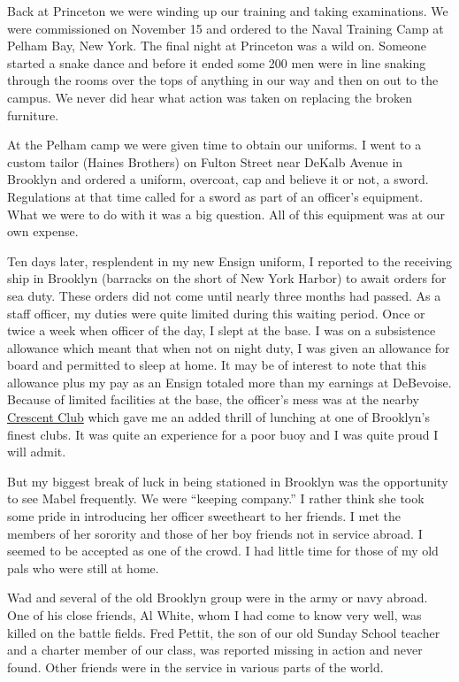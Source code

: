 \documentclass[12pt]{book}              %
\begin{document}
Back at Princeton we were winding up our training and taking examinations. We were commissioned on November 15 and ordered to the Naval Training Camp at Pelham Bay, New York. The final night at Princeton was a wild on. Someone started a snake dance and before it ended some 200 men were in line snaking through the rooms over the tops of anything in our way and then on out to the campus. We never did hear what action was taken on replacing the broken furniture. 

At the Pelham camp we were given time to obtain our uniforms. I went to a custom tailor (Haines Brothers) on Fulton Street near DeKalb Avenue in Brooklyn and ordered a uniform, overcoat, cap and believe it or not, a sword. Regulations at that time called for a sword as part of an officer's equipment. What we were to do with it was a big question. All of this equipment was at our own expense. 

Ten days later, resplendent in my new Ensign uniform, I reported to the receiving ship in Brooklyn (barracks on the short of New York Harbor) to await orders for sea duty. These orders did not come until nearly three months had passed. As a staff officer, my duties were quite limited during this waiting period. Once or twice a week when officer of the day, I slept at the base. I was on a subsistence allowance which meant that when not on night duty, I was given an allowance for board and permitted to sleep at home. It may be of interest to note that this allowance plus my pay as an Ensign totaled more than my earnings at DeBevoise. Because of limited facilities at the base, the officer's mess was at the nearby \href{http://en.wikipedia.org/wiki/Crescent_Athletic_Club_House}{Crescent Club} which gave me an added thrill of lunching at one of Brooklyn's finest clubs. It was quite an experience for a poor buoy and I was quite proud I will admit. 

But my biggest break of luck in being stationed in Brooklyn was the opportunity to see Mabel frequently. We were ``keeping company.'' I rather think she took some pride in introducing her officer sweetheart to her friends. I met the members of her sorority and those of her boy friends not in service abroad. I seemed to be accepted as one of the crowd. I had little time for those of my old pals who were still at home. 

Wad and several of the old Brooklyn group were in the army or navy abroad. One of his close friends, Al White, whom I had come to know very well, was killed on the battle fields. Fred Pettit, the son of our old Sunday School teacher and a charter member of our class, was reported missing in action and never found. Other friends were in the service in various parts of the world. 
\end{document}
